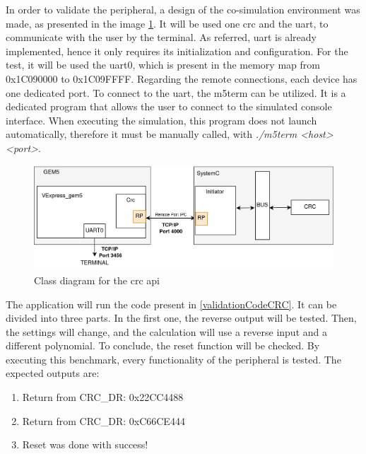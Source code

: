 In order to validate the peripheral, a design of the co-simulation environment was made, as presented in the image 
\ref{fig_CoSimDesign_Validation}. It will be used one \gls*{crc} and the \gls*{uart}, to communicate with the user by the terminal.
As referred, \gls{uart} is already implemented, hence it only requires its initialization and configuration. For the test, it will be used the 
\gls*{uart}0, which is present in the memory map from 0x1C090000 to 0x1C09FFFF.
Regarding the remote connections, each device has one dedicated port. To connect to the \gls*{uart}, the m5term can be utilized. It is
a dedicated program that allows the user to connect to the simulated console interface. When executing the simulation, this program does not
launch automatically, therefore it must be manually called, with \textit{./m5term <host> <port>}.

\begin{figure}[H]
	\centering
 	\includegraphics[width=0.8\linewidth]{Images/CoSimDesign_Validation.png} 
 	\caption{Class diagram for the \gls{crc} \gls{api}}
	\label{fig_CoSimDesign_Validation}
\end{figure}

The application will run the code present in \ref{validationCodeCRC}. It can be divided into three parts. In the first one, the reverse 
output will be tested. Then, the settings will change, and the calculation will use a reverse input and a different polynomial. To
conclude, the reset function will be checked. By executing this benchmark, every functionality of the peripheral is tested. The expected
outputs are:

\begin{enumerate}
	\item Return from CRC\_DR: 0x22CC4488
	\item Return from CRC\_DR: 0xC66CE444
	\item Reset was done with success!
\end{enumerate}

